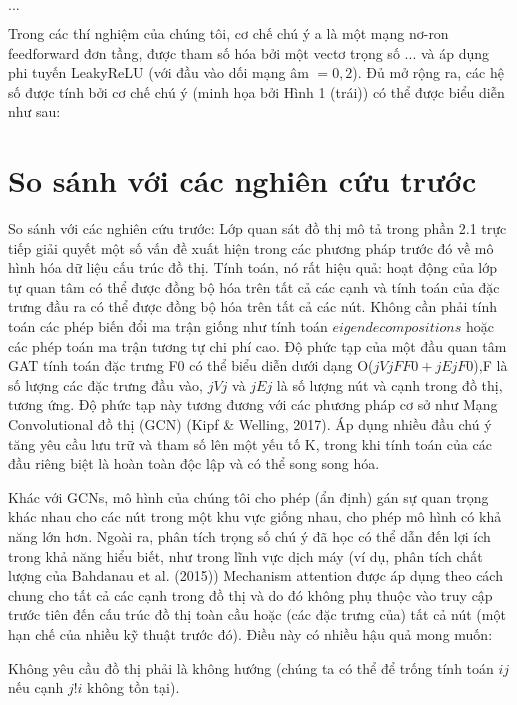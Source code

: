 $...$

Trong các thí nghiệm của chúng tôi, cơ chế chú ý a là một mạng nơ-ron feedforward đơn tầng, được tham số hóa bởi một vectơ trọng số $...$ và áp dụng phi tuyến LeakyReLU (với đầu vào dối mạng âm $ = 0,2$). Đủ mở rộng ra, các hệ số được tính bởi cơ chế chú ý (minh họa bởi Hình 1 (trái)) có thể được biểu diễn như sau:

\section{So sánh với các nghiên cứu trước}
\label{sec:So sánh với các nghiên cứu trước}
So sánh với các nghiên cứu trước:
Lớp quan sát đồ thị mô tả trong phần 2.1 trực tiếp giải quyết một số vấn đề xuất hiện trong các phương pháp trước đó về mô hình hóa dữ liệu cấu trúc đồ thị.
Tính toán, nó rất hiệu quả: hoạt động của lớp tự quan tâm có thể được đồng bộ hóa trên tất cả các cạnh và tính toán của đặc trưng đầu ra có thể được đồng bộ hóa trên tất cả các nút. Không cần phải tính toán các phép biến đổi ma trận giống như tính toán $eigendecompositions$ hoặc các phép toán ma trận tương tự chi phí cao. Độ phức tạp của một đầu quan tâm GAT tính toán đặc trưng F0 có thể biểu diễn dưới dạng O($jV jFF0 + jEjF0$),F là số lượng các đặc trưng đầu vào, $jV j$ và $jEj$ là số lượng nút và cạnh trong đồ thị, tương ứng. Độ phức tạp này tương đương với các phương pháp cơ sở như Mạng Convolutional đồ thị (GCN) (Kipf \& Welling, 2017). Áp dụng nhiều đầu chú ý tăng yêu cầu lưu trữ và tham số lên một yếu tố K, trong khi tính toán của các đầu riêng biệt là hoàn toàn độc lập và có thể song song hóa.

Khác với GCNs, mô hình của chúng tôi cho phép (ẩn định) gán sự quan trọng khác nhau cho các nút trong một khu vực giống nhau, cho phép mô hình có khả năng lớn hơn. Ngoài ra, phân tích trọng số chú ý đã học có thể dẫn đến lợi ích trong khả năng hiểu biết, như trong lĩnh vực dịch máy (ví dụ, phân tích chất lượng của Bahdanau et al. (2015))
Mechanism attention được áp dụng theo cách chung cho tất cả các cạnh trong đồ thị và do đó không phụ thuộc vào truy cập trước tiên đến cấu trúc đồ thị toàn cầu hoặc (các đặc trưng của) tất cả nút (một hạn chế của nhiều kỹ thuật trước đó). Điều này có nhiều hậu quả mong muốn:

Không yêu cầu đồ thị phải là không hướng (chúng ta có thể để trống tính toán $ij$ nếu cạnh $j ! i$ không tồn tại).

